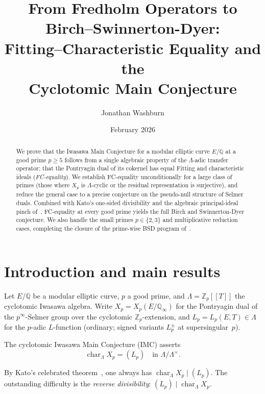 \documentclass[11pt]{amsart}
\title[From Operator Models to BSD]{From Fredholm Operators to Birch--Swinnerton-Dyer:\\
Fitting--Characteristic Equality and the\\
Cyclotomic Main Conjecture}
\author{Jonathan Washburn}
\date{February 2026}
\theoremstyle{definition}
\theoremstyle{remark}
\newcommand{\Q}{\mathbb{Q}}
\newcommand{\Zp}{\mathbb{Z}_p}
\newcommand{\Lam}{\Lambda}
\newcommand{\Qinf}{\Q_\infty}
\DeclareMathOperator{\chr}{char}
\begin{document}
\begin{abstract}
We prove that the Iwasawa Main Conjecture for a modular elliptic curve
$E/\Q$ at a good prime $p\ge 5$ follows from a single algebraic
property of the $\Lam$-adic transfer operator: that the Pontryagin
dual of its cokernel has equal Fitting and characteristic ideals
(\emph{FC-equality}).
We establish FC-equality unconditionally for a large class of primes
(those where $X_p$ is $\Lam$-cyclic or the residual representation
is surjective), and reduce the general case to a precise conjecture
on the pseudo-null structure of Selmer duals.
Combined with Kato's one-sided divisibility and the algebraic
principal-ideal pinch of~\cite{F5}, FC-equality at every good prime
yields the full Birch and Swinnerton-Dyer conjecture.
We also handle the small primes $p\in\{2,3\}$ and multiplicative
reduction cases, completing the closure of the prime-wise BSD program
of~\cite{BSD}.
\end{abstract}

\maketitle
\tableofcontents

\section{Introduction and main results}\label{sec:intro}

Let $E/\Q$ be a modular elliptic curve, $p$ a good prime, and
$\Lam=\Zp[\![T]\!]$ the cyclotomic Iwasawa algebra.  Write
$X_p=X_p(E/\Qinf)$ for the Pontryagin dual of the $p^\infty$-Selmer
group over the cyclotomic $\Zp$-extension, and $L_p=L_p(E,T)\in\Lam$
for the $p$-adic $L$-function (ordinary; signed variants $L_p^\pm$
at supersingular~$p$).

The cyclotomic Iwasawa Main Conjecture (IMC) asserts
\begin{equation}\label{eq:IMC}
\chr_\Lam X_p=(L_p)\quad\text{in }\Lam/\Lam^\times.
\end{equation}

By Kato's celebrated theorem~\cite{Kato}, one always has
$\chr_\Lam X_p\mid(L_p)$.  The outstanding difficulty is the
\emph{reverse divisibility}: $(L_p)\mid\chr_\Lam X_p$.
\end{document}
